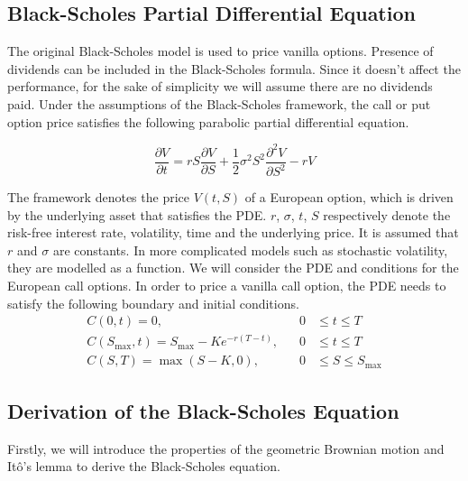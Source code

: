 \documentclass[12pt, oneside]{book}
\theoremstyle{plain}
\theoremstyle{definition}
\begin{document}
\subsection{Black-Scholes Partial Differential Equation}
The original Black-Scholes model is used to price vanilla options. Presence of dividends can be included in the Black-Scholes formula. Since it doesn't affect the performance, for the sake of simplicity we will assume there are no dividends paid. Under the assumptions of the Black-Scholes framework, the call or put option price satisfies the following parabolic partial differential equation.

\begin{equation}
\frac{\partial V}{\partial t} = rS\frac{\partial V}{\partial S}+\frac{1}{2} \sigma^2 S^2 \frac{\partial^2 V}{\partial S^2} - rV
\end{equation}

The framework denotes the price $V(t, S)$ of a European option, which is driven by the underlying asset that satisfies the PDE. $r$, $\sigma$, $t$, $S$ respectively denote the risk-free interest rate, volatility, time and the underlying price.  It is assumed that $r$ and $\sigma$ are constants. In more complicated models such as stochastic volatility, they are modelled as a function. We will consider the  PDE and conditions for the European call options.  In order to price a vanilla call option, the PDE needs to satisfy the following boundary and initial conditions. 
\begin{eqnarray}
C(0,t) = 0, \hspace{10pt}  &0& \leq t \leq T   \\[10pt]
C(S_{\max},t)=S_{\max} - K e^{-r(T-t)}, \hspace{10pt} &0& \leq t \leq T \\[10pt]
C(S,T) = \max(S-K,0), \hspace{10pt} &0& \leq S \leq S_{\max}
\end{eqnarray}

\subsection{Derivation of the Black-Scholes Equation}
Firstly, we will introduce the properties of the geometric Brownian motion and It\^{o}'s lemma to derive the Black-Scholes equation.
\end{document}

